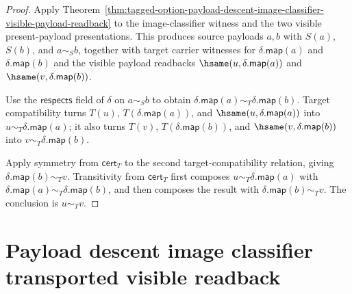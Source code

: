 \begin{proof}
Apply Theorem~\ref{thm:tagged-option-payload-descent-image-classifier-visible-payload-readback}
to the image-classifier witness and the two visible present-payload
presentations. This produces source payloads $a,b$ with $S(a)$, $S(b)$, and
$a\sim_S b$, together with target carrier witnesses for
$\delta.\mathsf{map}(a)$ and $\delta.\mathsf{map}(b)$ and the visible payload
readbacks $\hsame(u,\delta.\mathsf{map}(a))$ and
$\hsame(v,\delta.\mathsf{map}(b))$.

Use the $\mathsf{respects}$ field of $\delta$ on $a\sim_S b$ to obtain
$\delta.\mathsf{map}(a)\sim_T\delta.\mathsf{map}(b)$. Target compatibility turns
$T(u)$, $T(\delta.\mathsf{map}(a))$, and
$\hsame(u,\delta.\mathsf{map}(a))$ into
$u\sim_T\delta.\mathsf{map}(a)$; it also turns $T(v)$,
$T(\delta.\mathsf{map}(b))$, and $\hsame(v,\delta.\mathsf{map}(b))$ into
$v\sim_T\delta.\mathsf{map}(b)$.

Apply symmetry from $\mathsf{cert}_T$ to the second target-compatibility
relation, giving $\delta.\mathsf{map}(b)\sim_T v$. Transitivity from
$\mathsf{cert}_T$ first composes
$u\sim_T\delta.\mathsf{map}(a)$ with
$\delta.\mathsf{map}(a)\sim_T\delta.\mathsf{map}(b)$, and then composes the
result with $\delta.\mathsf{map}(b)\sim_T v$. The conclusion is $u\sim_T v$.
\end{proof}

\section{Payload descent image classifier transported visible readback}
\label{sec:option-image-classifier-transported-visible-readback}

